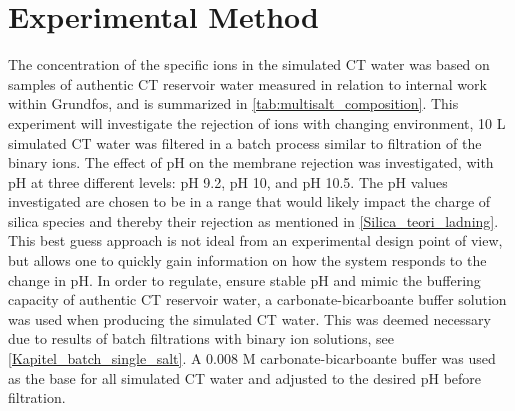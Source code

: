 \section{Experimental Method}




The concentration of the specific ions in the simulated CT water was based on samples of authentic CT reservoir water measured in relation to internal work within Grundfos, and is summarized in \cref{tab:multisalt_composition}. 
This experiment will investigate the rejection of ions with changing environment, 10 L simulated CT water was filtered in a batch process similar to filtration of the binary ions.
The effect of pH on the membrane rejection was investigated, with pH at three different levels: pH 9.2, pH 10, and pH 10.5. 
The pH values investigated are chosen to be in a range that would likely impact the charge of silica species and thereby their rejection as mentioned in \cref{Silica_teori_ladning}. 
This best guess approach is not ideal from an experimental design point of view, but allows one to quickly gain information on how the system responds to the change in pH.
In order to regulate, ensure stable pH and mimic the buffering capacity of authentic CT reservoir water, a carbonate-bicarboante buffer solution was used when producing the simulated CT water. 
This was deemed necessary due to results of batch filtrations with binary ion solutions, see \cref{Kapitel_batch_single_salt}.
A 0.008 M carbonate-bicarboante buffer was used as the base for all simulated CT water and adjusted to the desired pH before filtration. 







